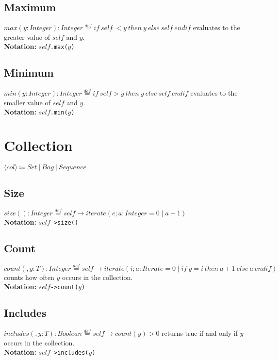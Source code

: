 \subsection{Maximum} $\mathit{max}(y:\mathit{Integer}):\mathit{Integer}\stackrel{def}{=}\mathit{if}\
\mathit{self}\ < y\ \mathit{then}\
y\ \mathit{else}\
  \mathit{self}\ \mathit{endif}$ evaluates to the greater value of $\mathit{self}$ and $y$.\\
  {\bf Notation:} $\mathit{self}$\verb+.max(+$y$\verb+)+
\subsection{Minimum} $\mathit{min}(y:\mathit{Integer}):\mathit{Integer}\stackrel{def}{=}\mathit{if}\
\mathit{self} > y\ \mathit{then}\
y\
  \mathit{else}\ \mathit{self}\ \mathit{endif}$ evaluates to the smaller value of $\mathit{self}$
  and $y$.\\
  {\bf Notation:} $\mathit{self}$\verb+.min(+$y$\verb+)+
\section{Collection}
$\langle\mathit{col}\rangle \Coloneqq \mathit{Set}\ |\ \mathit{Bag}\ |\ \mathit{Sequence}$
\subsection{Size}
$\mathit{size}():\mathit{Integer}\stackrel{def}{=}\mathit{self}\rightarrow\mathit{iterate}(e;a:\mathit{Integer}=0\mid
a+1)$\\
  {\bf Notation:} $\mathit{self}$\verb+->size()+
\subsection{Count}
$\mathit{count}(,y:T):\mathit{Integer}\stackrel{def}{=}
  \mathit{self}\rightarrow\mathit{iterate}(i;a:\mathit{Iterate}=0\mid\mathit{if}\ y=i\ \mathit{then}\ a+1\ \mathit{else}\
  a\ \mathit{endif})$ counts how often $y$ occurs in the collection.\\
  {\bf Notation:} $\mathit{self}$\verb+->count(+$y$\verb+)+
\subsection{Includes}
$\mathit{includes}(,y:T):\mathit{Boolean}\stackrel{def}{=}\mathit{self}\rightarrow\mathit{count}(y)>0$
  returns true if and only if $y$ occurs in the collection.\\
  {\bf Notation:} $\mathit{self}$\verb+->includes(+$y$\verb+)+
